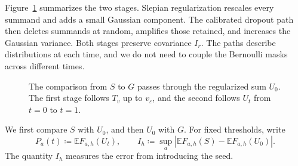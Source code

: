 \documentclass[11pt,letterpaper]{article}
\theoremstyle{remark}
\newcommand{\E}{\mathbb E}
\begin{document}
Figure~\ref{fig:two-stage-path} summarizes the two stages. Slepian
regularization rescales every summand and adds a small Gaussian component.
The calibrated dropout path then deletes summands at random, amplifies
those retained, and increases the Gaussian variance. Both stages preserve
covariance \(I_r\). The paths describe distributions at each time, and
we do not need to couple the Bernoulli masks across different times.

\begin{figure}[htbp]
\centering
{}
\caption{The comparison from \(S\) to \(G\) passes through the regularized
sum \(U_0\). The first stage follows \(T_v\) up to \(v_\varepsilon\),
and the second follows \(U_t\) from \(t=0\) to \(t=1\).}
\label{fig:two-stage-path}
\end{figure}

We first compare \(S\) with \(U_0\), and then \(U_0\) with \(G\).
For fixed thresholds, write
\[
 P_a(t)\coloneqq\E F_{a,h}(U_t),\qquad
 I_h\coloneqq\sup_a|\E F_{a,h}(S)-\E F_{a,h}(U_0)|.
\]
The quantity \(I_h\) measures the error from introducing the seed.
\end{document}
